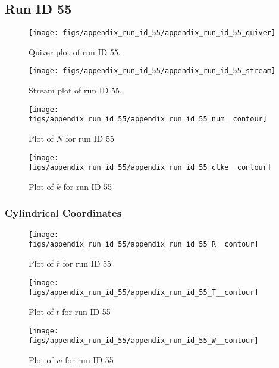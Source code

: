 \subsection{Run ID 55}
\begin{figure}[H]
\centering
\texttt{[image: figs/appendix\_run\_id\_55/appendix\_run\_id\_55\_quiver]}
\caption{Quiver plot of run ID 55.}
\label{fig:appendix_run_id_55_quiver}
\end{figure}


\begin{figure}[H]
\centering
\texttt{[image: figs/appendix\_run\_id\_55/appendix\_run\_id\_55\_stream]}
\caption{Stream plot of run ID 55.}
\label{fig:appendix_run_id_55_stream}
\end{figure}


\begin{figure}[H]
\centering
\texttt{[image: figs/appendix\_run\_id\_55/appendix\_run\_id\_55\_num\_\_contour]}
\caption{Plot of $N$ for run ID 55}
\label{fig:appendix_run_id_55_num__contour}
\end{figure}


\begin{figure}[H]
\centering
\texttt{[image: figs/appendix\_run\_id\_55/appendix\_run\_id\_55\_ctke\_\_contour]}
\caption{Plot of $k$ for run ID 55}
\label{fig:appendix_run_id_55_ctke__contour}
\end{figure}


\subsubsection{Cylindrical Coordinates}
\begin{figure}[H]
\centering
\texttt{[image: figs/appendix\_run\_id\_55/appendix\_run\_id\_55\_R\_\_contour]}
\caption{Plot of $\overline{r}$ for run ID 55}
\label{fig:appendix_run_id_55_R__contour}
\end{figure}


\begin{figure}[H]
\centering
\texttt{[image: figs/appendix\_run\_id\_55/appendix\_run\_id\_55\_T\_\_contour]}
\caption{Plot of $\overline{t}$ for run ID 55}
\label{fig:appendix_run_id_55_T__contour}
\end{figure}


\begin{figure}[H]
\centering
\texttt{[image: figs/appendix\_run\_id\_55/appendix\_run\_id\_55\_W\_\_contour]}
\caption{Plot of $\overline{w}$ for run ID 55}
\label{fig:appendix_run_id_55_W__contour}
\end{figure}



